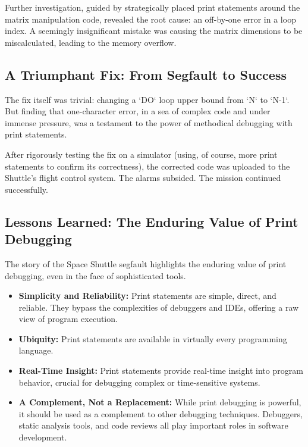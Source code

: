 \documentclass{article}
\begin{document}
{{{{Further investigation, guided by strategically placed print statements around the matrix manipulation code, revealed the root cause: an off-by-one error in a loop index. A seemingly insignificant mistake was causing the matrix dimensions to be miscalculated, leading to the memory overflow.

\subsection*{A Triumphant Fix: From Segfault to Success}

The fix itself was trivial: changing a `DO` loop upper bound from `N` to `N-1`. But finding that one-character error, in a sea of complex code and under immense pressure, was a testament to the power of methodical debugging with print statements.

After rigorously testing the fix on a simulator (using, of course, more print statements to confirm its correctness), the corrected code was uploaded to the Shuttle's flight control system. The alarms subsided. The mission continued successfully.

\subsection*{Lessons Learned: The Enduring Value of Print Debugging}

The story of the Space Shuttle segfault highlights the enduring value of print debugging, even in the face of sophisticated tools.

\begin{itemize}
    \item \textbf{Simplicity and Reliability:} Print statements are simple, direct, and reliable. They bypass the complexities of debuggers and IDEs, offering a raw view of program execution.
    \item \textbf{Ubiquity:} Print statements are available in virtually every programming language.
    \item \textbf{Real-Time Insight:} Print statements provide real-time insight into program behavior, crucial for debugging complex or time-sensitive systems.
    \item \textbf{A Complement, Not a Replacement:} While print debugging is powerful, it should be used as a complement to other debugging techniques. Debuggers, static analysis tools, and code reviews all play important roles in software development.
\end{itemize}

}}}}
\end{document}
